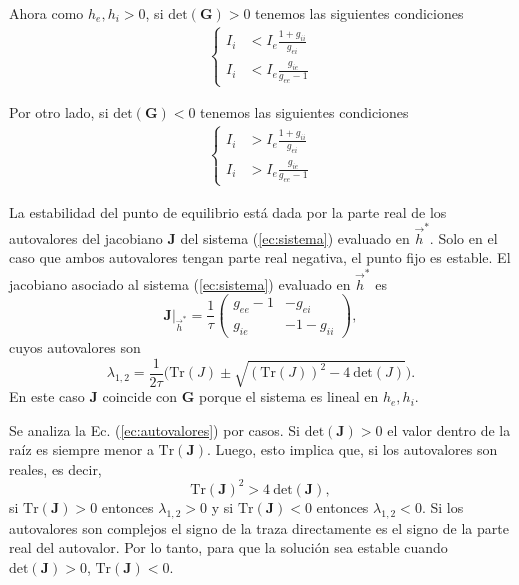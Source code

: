\documentclass[11pt,twocolumn,twoside]{opticajnl}
\begin{document}
Ahora como $h_e,h_i > 0$, si $\text{det}(\boldsymbol{G}) > 0$ tenemos las siguientes condiciones
\begin{align}
    \left\{
    \begin{aligned}
        I_i &< I_e \frac{1+g_{ii}}{g_{ei}}\\
        I_i &< I_e \frac{g_{ie}}{g_{ee}-1}
    \end{aligned}
    \right.
\end{align}

Por otro lado, si $\text{det}(\boldsymbol{G}) < 0$ tenemos las siguientes condiciones
\begin{align}
    \left\{
    \begin{aligned}
        I_i &> I_e \frac{1+g_{ii}}{g_{ei}}\\
        I_i &> I_e \frac{g_{ie}}{g_{ee}-1}
    \end{aligned}
    \right.
\end{align}

La estabilidad del punto de equilibrio está dada por la parte real de los autovalores del jacobiano $\boldsymbol{J}$ del sistema (\ref{ec:sistema}) evaluado en $\vec{h}^*$. Solo en el caso que ambos autovalores tengan parte real negativa, el punto fijo es estable. El jacobiano asociado al sistema (\ref{ec:sistema}) evaluado en $\vec{h}^*$ es 
\[
\boldsymbol{J}|_{\vec{h}^*} = \frac{1}{\tau}\begin{pmatrix} g_{ee} - 1 & -g_{ei} \\ g_{ie} & -1-g_{ii} \end{pmatrix},
\]
cuyos autovalores son
\begin{equation}
    \lambda_{1,2} = \frac{1}{2\tau} \biggr( \text{Tr}(J) \pm \sqrt{ (\text{Tr}(J))^2 - 4~\text{det}(J) } \biggr).
    \label{ec:autovalores}
\end{equation}
En este caso $\boldsymbol{J}$ coincide con $\boldsymbol{G}$ porque el sistema es lineal en $h_e, h_i$.

Se analiza la Ec. (\ref{ec:autovalores}) por casos. Si $\text{det}(\boldsymbol{J}) > 0$ el valor dentro de la raíz es siempre menor a $\text{Tr}(\boldsymbol{J})$. Luego, esto implica que, si los autovalores son reales, es decir, 
\begin{equation}
    \text{Tr}(\boldsymbol{J})^2 > 4~\text{det}(\boldsymbol{J}), 
\end{equation}
si $\text{Tr}(\boldsymbol{J}) > 0$ entonces $ \lambda_{1,2} > 0 $ y si $\text{Tr}(\boldsymbol{J}) < 0$ entonces $ \lambda_{1,2} < 0 $. Si los autovalores son complejos el signo de la traza directamente es el signo de la parte real del autovalor. Por lo tanto, para que la solución sea estable cuando $\text{det}(\boldsymbol{J}) > 0$,  $\text{Tr}(\boldsymbol{J}) < 0$. 
\end{document}
